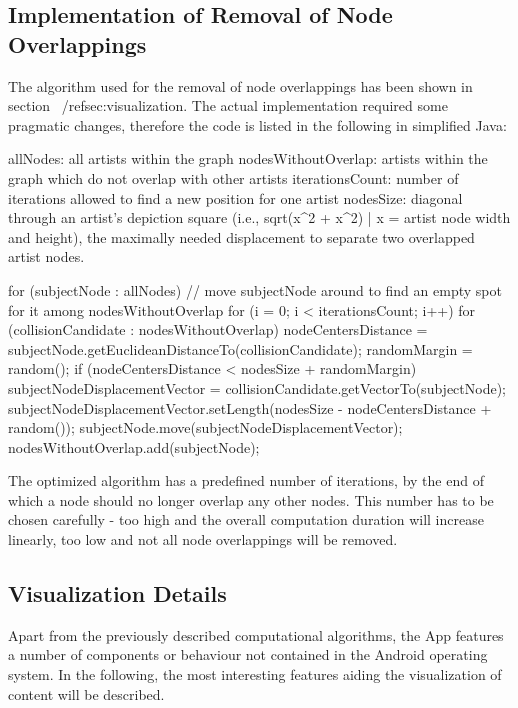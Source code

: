 \subsection{Implementation of Removal of Node Overlappings}
\label{subsec:implementation-overlapping}

The algorithm used for the removal of node overlappings has been shown in section ~/ref{sec:visualization}. The actual implementation required some pragmatic changes, therefore the code is listed in the following in simplified Java:

\begin{code}
allNodes: all artists within the graph
nodesWithoutOverlap: artists within the graph which do not overlap with other artists
iterationsCount: number of iterations allowed to find a new position for one artist
nodesSize: diagonal through an artist's depiction square 
  (i.e., sqrt(x^2 + x^2) | x = artist node width and height), the maximally needed displacement
  to separate two overlapped artist nodes.
	
for (subjectNode : allNodes) {
  // move subjectNode around to find an empty spot for it among nodesWithoutOverlap
  for (i = 0; i < iterationsCount; i++) {
    for (collisionCandidate : nodesWithoutOverlap) {
      nodeCentersDistance = subjectNode.getEuclideanDistanceTo(collisionCandidate);
      randomMargin = random();
      if (nodeCentersDistance < nodesSize + randomMargin) {
        subjectNodeDisplacementVector = collisionCandidate.getVectorTo(subjectNode);
        subjectNodeDisplacementVector.setLength(nodesSize - nodeCentersDistance + random()); 
        subjectNode.move(subjectNodeDisplacementVector);
      }
    }
  }
  nodesWithoutOverlap.add(subjectNode);
}
\end{code}

The optimized algorithm has a predefined number of iterations, by the end of which a node should no longer overlap any other nodes. This number has to be chosen carefully - too high and the overall computation duration will increase linearly, too low and not all node overlappings will be removed.

\subsection{Visualization Details}

Apart from the previously described computational algorithms, the App features a number of components or behaviour not contained in the Android operating system. In the following, the most interesting features aiding the visualization of content will be described.

